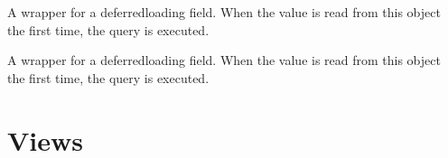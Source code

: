 \documentclass[letterpaper,10pt,english,openany,oneside]{sphinxmanual}
\begin{document}
\begin{fulllineitems}
\begin{fulllineitems}
\label{\detokenize{modules/models:users.models.userdata.id}}
A wrapper for a deferred\sphinxhyphen{}loading field. When the value is read from this
object the first time, the query is executed.

\end{fulllineitems}


\begin{fulllineitems}
\label{\detokenize{modules/models:users.models.userdata.name}}
A wrapper for a deferred\sphinxhyphen{}loading field. When the value is read from this
object the first time, the query is executed.

\end{fulllineitems}


\begin{fulllineitems}
\label{\detokenize{modules/models:users.models.userdata.objects}}
\end{fulllineitems}


\end{fulllineitems}



\chapter{Views}
\label{\detokenize{modules/views:module-users.views}}\label{\detokenize{modules/views:views}}\label{\detokenize{modules/views::doc}}\label{\detokenize{modules/views:module-blog.views}}

\begin{fulllineitems}
\label{\detokenize{modules/views:blog.views.home}}
\end{fulllineitems}
\end{document}
